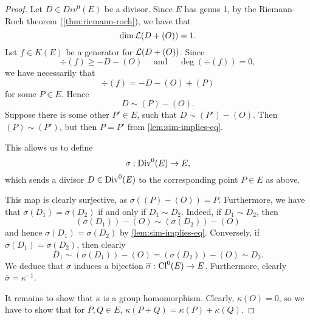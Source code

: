 \begin{proof}
	Let $D \in Div^0(E)$ be a divisor. Since $E$ has genus 1, 
	by the Riemann-Roch theorem (\ref{thm:riemann-roch}), we have that
	\begin{equation*}
		\dim\mathcal{L}(D + (O)) = 1.
	\end{equation*}
	Let $f \in K(E)$ be a generator for $\mathcal{L}(D + (O))$. Since
	\begin{equation*}
		\div(f) \geq -D -(O)
		\quad\textrm{ and }\quad
		\deg(\div(f)) = 0,
	\end{equation*}
	we have necessarily that 
	\begin{equation*}
		\div(f) = -D -(O) + (P)
	\end{equation*}
	for some $P \in E$.
	Hence 
	\begin{equation*}
		D \sim (P) - (O).
	\end{equation*}
	Suppose there is some other $P' \in E$, such that $D \sim (P') - (O)$.
	Then $(P) \sim (P')$, but then $P = P'$ from \ref{lem:sim-implies-eq}.
	
	This allows us to define
	\begin{equation*}
		\sigma: \operatorname{Div}^0(E) \to E,
	\end{equation*}
	which sends a divisor $D \in \operatorname{Div}^0(E)$ to the corresponding point $P \in E$
	as above.

	This map is clearly surjective, as $\sigma((P) - (O)) = P$. Furthermore, we
	have that $\sigma(D_1) = \sigma(D_2)$ if and only if $D_1 \sim D_2$.
	Indeed, if $D_1 \sim D_2$, then 
	\begin{equation*}
		(\sigma(D_1)) - (O) \sim (\sigma(D_2)) - (O)
	\end{equation*}	
	and hence $\sigma(D_1) = \sigma(D_2)$ by \ref{lem:sim-implies-eq}.
	Conversely, if $\sigma(D_1) = \sigma(D_2)$, then clearly
	\begin{equation*}
		D_1 \sim (\sigma(D_1)) - (O) = (\sigma(D_2)) - (O) \sim D_2.
	\end{equation*}
	We deduce that $\sigma$ induces a bijection $\overline{\sigma}: \operatorname{Cl}^0(E) \to E$.
	Furthermore, clearly $\overline{\sigma} = \kappa^{-1}$.

	It remains to show that $\kappa$ is a group homomorphism.
	Clearly, $\kappa(O) = 0$, so we have to show that for $P, Q \in E$,
	$\kappa(P + Q) = \kappa(P) + \kappa(Q)$.


\end{proof}
